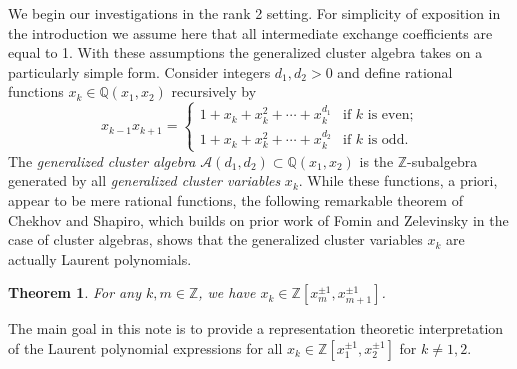 \documentclass{amsart}
\numberwithin{equation}{section}
\newtheorem{theorem}{Theorem}[section]
\theoremstyle{definition}
\def\QQ{\mathbb{Q}}
\def\ZZ{\mathbb{Z}}
\def\cA{\mathcal{A}}
\begin{document}
We begin our investigations in the rank 2 setting.  
For simplicity of exposition in the introduction we assume here that all intermediate exchange coefficients are equal to 1.  
With these assumptions the generalized cluster algebra takes on a particularly simple form.  Consider integers $d_1,d_2>0$ and define rational functions $x_k\in\QQ(x_1,x_2)$ recursively by
\begin{equation}\label{eq:exchange relation}
  x_{k-1}x_{k+1}=\begin{cases}1+x_k+x_k^2+\cdots+x_k^{d_1} & \text{if $k$ is even;}\\1+x_k+x_k^2+\cdots+x_k^{d_2} & \text{if $k$ is odd.}\end{cases}
\end{equation}
The \emph{generalized cluster algebra} $\cA(d_1,d_2)\subset\QQ(x_1,x_2)$ is the $\ZZ$-subalgebra generated by all \emph{generalized cluster variables} $x_k$.
While these functions, a priori, appear to be mere rational functions, the following remarkable theorem of Chekhov and Shapiro, which builds on prior work of Fomin and Zelevinsky in the case of cluster algebras, shows that the generalized cluster variables $x_k$ are actually Laurent polynomials.
\begin{theorem}\cite{fomin-zelevinsky1,chekhov-shapiro}
  For any $k,m\in\ZZ$, we have $x_k\in\ZZ[x_m^{\pm1},x_{m+1}^{\pm1}]$.
\end{theorem}
The main goal in this note is to provide a representation theoretic interpretation of the Laurent polynomial expressions for all $x_k\in\ZZ[x_1^{\pm1},x_2^{\pm1}]$ for $k\ne 1,2$.
\end{document}
